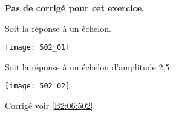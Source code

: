 \normaltrue \difficilefalse \tdifficilefalse
\correctionfalse


\setcounter{numques}{0}
\ifcorrection
\else
\textbf{Pas de corrigé pour cet exercice.}
\fi


\ifprof 
\else
Soit la réponse à un échelon.
\begin{center}
\texttt{[image: 502\_01]}
\end{center}
\fi

\ifprof
\else
\fi



\ifprof 
\else
Soit la réponse à un échelon d'amplitude 2,5.

\begin{center}
\texttt{[image: 502\_02]}
\end{center}
\fi

\ifprof
\else
\fi



\ifprof
\else
\begin{flushright}
\footnotesize{Corrigé  voir \ref{B2:06:502}.}
\end{flushright}%
\fi